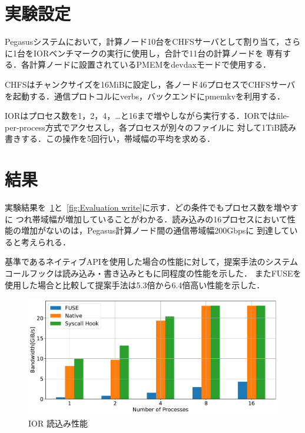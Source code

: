 \documentclass[a4paper,11pt]{jreport}
\begin{document}
\section{実験設定}
Pegasusシステムにおいて，計算ノード10台をCHFSサーバとして割り当て，さらに1台をIORベンチマークの実行に使用し，合計で11台の計算ノードを
専有する．各計算ノードに設置されているPMEMをdevdaxモードで使用する．

CHFSはチャンクサイズを16MiBに設定し，各ノード46プロセスでCHFSサーバを起動する．通信プロトコルにverbs，バックエンドにpmemkvを利用する．

IORはプロセス数を1，2，4，…と16まで増やしながら実行する．IORではfile-per-process方式でアクセスし，各プロセスが別々のファイルに
対して1TiB読み書きする．この操作を5回行い，帯域幅の平均を求める．
\section{結果}

実験結果を\figurename~\ref{fig:Evaluation read}と\figurename~\ref{fig:Evaluation write}に示す．どの条件でもプロセス数を増やすに
つれ帯域幅が増加していることがわかる．読み込みの16プロセスにおいて性能の増加がないのは，Pegasus計算ノード間の通信帯域幅200Gbpsに
到達していると考えられる．

基準であるネイティブAPIを使用した場合の性能に対して，提案手法のシステムコールフックは読み込み・書き込みともに同程度の性能を示した．
またFUSEを使用した場合と比較して提案手法は5.3倍から6.4倍高い性能を示した．

\newpage

\begin{figure}[h]
	\begin{minipage}[b]{1\columnwidth}
		\centering
		\includegraphics[width=0.9\linewidth]{./figure/ior_benchmark_read_v2.pdf}
		\caption{IOR 読込み性能}
		\label{fig:Evaluation read}
	\end{minipage}
\end{figure}
\end{document}
